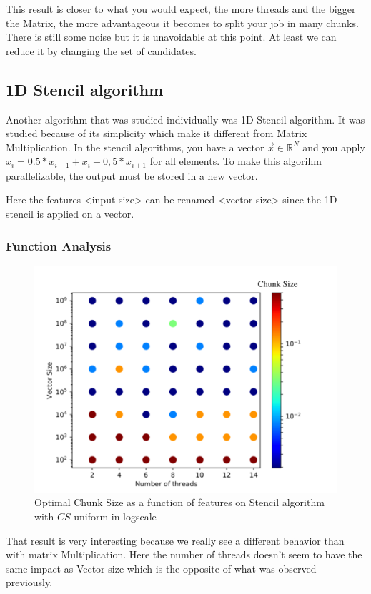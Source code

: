 This result is closer to what you would expect, the more threads and the bigger the Matrix, the more advantageous it becomes to split your job in many chunks. There is still some noise but it is unavoidable at this point. At least we can reduce it by changing the set of candidates.
\subsection{1D Stencil algorithm}

Another algorithm that was studied individually was 1D Stencil algorithm. It was studied because of its simplicity which make it different from Matrix Multiplication. In the stencil algorithms, you have a vector $\vec{x} \in \mathbb{R}^N$ and you apply $x_i=0.5*x_{i-1}+x_i+0,5*x_{i+1}$ for all elements. To make this algorihm parallelizable, the output must be stored in a new vector.

Here the features <input size> can be renamed <vector size> since the 1D stencil is applied on a vector.
\newpage
\subsubsection{Function Analysis}

\begin{figure}[h]
	\centering
	\includegraphics[scale=0.8]{images/stencil_function.pdf}
	\caption{Optimal Chunk Size as a function of features on Stencil algorithm with $CS$ uniform in logscale}
\end{figure}
That result is very interesting because we really see a different behavior than with matrix Multiplication. Here the number of threads doesn't seem to have the same impact as Vector size which is the opposite of what was observed previously.

